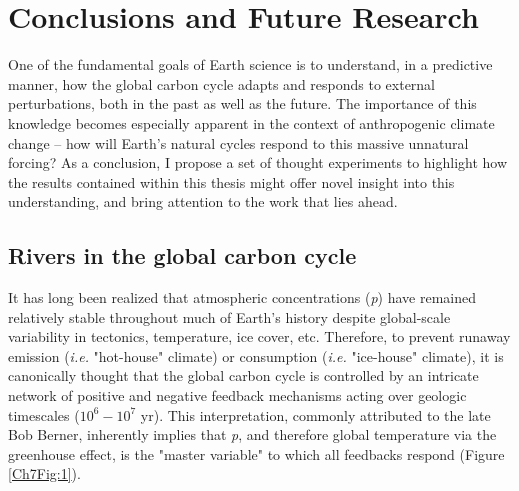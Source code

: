 \chapter{Conclusions and Future Research}
\label{Ch7}

\raggedbottom
\clearpage

One of the fundamental goals of Earth science is to understand, in a predictive manner, how the global carbon cycle adapts and responds to external perturbations, both in the past as well as the future. The importance of this knowledge becomes especially apparent in the context of anthropogenic climate change -- how will Earth's natural cycles respond to this massive unnatural forcing? As a conclusion, I propose a set of thought experiments to highlight how the results contained within this thesis might offer novel insight into this understanding, and bring attention to the work that lies ahead.

\section{Rivers in the global carbon cycle}

It has long been realized that atmospheric  concentrations (\textit{p}) have remained relatively stable throughout much of Earth's history despite global-scale variability in tectonics, temperature, ice cover, etc. Therefore, to prevent runaway  emission (\textit{i.e.} "hot-house" climate) or consumption (\textit{i.e.} "ice-house" climate), it is canonically thought that the global carbon cycle is controlled by an intricate network of positive and negative feedback mechanisms acting over geologic timescales ($10^6 - 10^7$ yr). This interpretation, commonly attributed to the late Bob Berner, inherently implies that \textit{p}, and therefore global temperature via the greenhouse effect, is the "master variable" to which all feedbacks respond (Figure \ref{Ch7Fig:1}).

